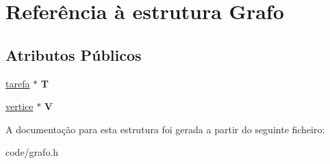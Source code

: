 \hypertarget{structGrafo}{\section{Referência à estrutura Grafo}
\label{structGrafo}
}
\subsection*{Atributos Públicos}
\begin{DoxyCompactItemize}
\item 
\hypertarget{structGrafo_aeb37989f62bb38c1b5ebce8bfa63ad32}{\hyperlink{structTarefa}{tarefa} $\ast$ {\bfseries T}}\label{structGrafo_aeb37989f62bb38c1b5ebce8bfa63ad32}

\item 
\hypertarget{structGrafo_a4e775d2343e09d233a66014c0a4e9b59}{\hyperlink{structVertice}{vertice} $\ast$ {\bfseries V}}\label{structGrafo_a4e775d2343e09d233a66014c0a4e9b59}

\end{DoxyCompactItemize}


A documentação para esta estrutura foi gerada a partir do seguinte ficheiro\-:\begin{DoxyCompactItemize}
\item 
code/grafo.\-h\end{DoxyCompactItemize}
